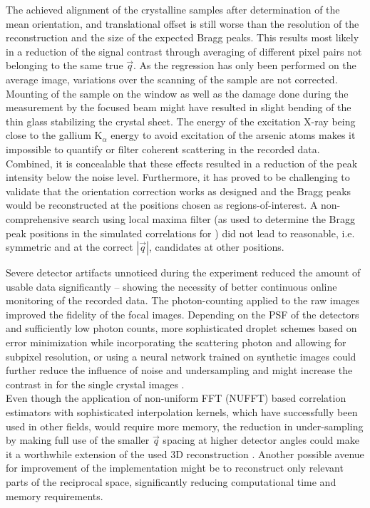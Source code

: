 The achieved alignment of the crystalline samples after determination of the mean orientation, and translational offset is still worse than the resolution of the reconstruction and the size of the expected Bragg peaks. This results  most likely in a reduction of the signal contrast through averaging of different pixel pairs not belonging to the same true $\vec{q}$. As the regression has only been performed on the average image, variations over the scanning of the sample are not corrected. Mounting of the sample on the window as well as the damage done during the measurement by the focused beam might have resulted in slight bending of the thin glass stabilizing the crystal sheet. The energy of the excitation X-ray being close to the gallium K$_\alpha$ energy to avoid excitation of the arsenic atoms makes it impossible to quantify or filter coherent scattering in the recorded data. Combined, it is concealable that these effects resulted in a reduction of the peak intensity below the noise level. Furthermore, it has proved to be challenging to validate that the orientation correction works as designed and the Bragg peaks would be reconstructed at the positions chosen as regions-of-interest. A non-comprehensive search using local maxima filter (as used to determine the Bragg peak positions in the simulated correlations for ) did not lead to reasonable, i.e. symmetric and at the correct $\left|\vec{q}\right|$, candidates at other positions.

Severe detector artifacts unnoticed during the experiment reduced the amount of usable data significantly -- showing the necessity of better continuous online monitoring of the recorded data. The photon-counting applied to the raw images improved the fidelity of the focal images. Depending on the PSF of the detectors and sufficiently low photon counts, more sophisticated droplet schemes based on error minimization while incorporating the scattering photon and allowing for subpixel resolution, or using a neural network trained on synthetic images could further reduce the influence of noise and undersampling and might increase the contrast in for the single crystal images \cite{baumann2018,collaboration2014,schayck2020,sun2020}.\\
Even though the application of non-uniform FFT (NUFFT) based correlation estimators with sophisticated interpolation kernels, which have successfully been used in other fields, would require more memory, the reduction in under-sampling by making full use of the smaller $\vec{q}$ spacing at higher detector angles could make it a worthwhile extension of the used 3D reconstruction \cite{laguna1998,yang2008,chang2020}. Another possible avenue for improvement of the implementation might be to reconstruct only relevant parts of the reciprocal space, significantly reducing computational time and memory requirements. 

